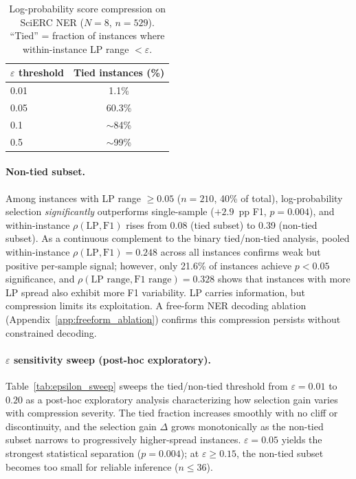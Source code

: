 \begin{table}[t]
\centering
\small
\caption{Log-probability score compression on SciERC NER ($N{=}8$, $n{=}529$). ``Tied'' = fraction of instances where within-instance LP range ${<}\varepsilon$.}
\label{tab:logprob_ties}
\begin{tabular}{lc}
\toprule
$\varepsilon$ threshold & Tied instances (\%) \\
\midrule
0.01 & 1.1\% \\
0.05 & 60.3\% \\
0.1  & ${\sim}$84\% \\
0.5  & ${\sim}$99\% \\
\bottomrule
\end{tabular}
\end{table}

\paragraph{Non-tied subset.}
Among instances with LP range ${\geq}0.05$ ($n{=}210$, 40\% of total), log-probability selection \textit{significantly} outperforms single-sample ($+2.9$~pp F1, $p{=}0.004$), and within-instance $\rho(\text{LP}, \text{F1})$ rises from 0.08 (tied subset) to 0.39 (non-tied subset).
As a continuous complement to the binary tied/non-tied analysis, pooled within-instance $\rho(\text{LP}, \text{F1}){=}0.248$ across all instances confirms weak but positive per-sample signal; however, only 21.6\% of instances achieve $p{<}0.05$ significance, and $\rho(\text{LP range}, \text{F1 range}){=}0.328$ shows that instances with more LP spread also exhibit more F1 variability. LP carries information, but compression limits its exploitation.
A free-form NER decoding ablation (Appendix~\ref{app:freeform_ablation}) confirms this compression persists without constrained decoding.

\paragraph{$\varepsilon$ sensitivity sweep (post-hoc exploratory).}
Table~\ref{tab:epsilon_sweep} sweeps the tied/non-tied threshold from $\varepsilon{=}0.01$ to $0.20$ as a post-hoc exploratory analysis characterizing how selection gain varies with compression severity.
The tied fraction increases smoothly with no cliff or discontinuity, and the selection gain $\Delta$ grows monotonically as the non-tied subset narrows to progressively higher-spread instances.
$\varepsilon{=}0.05$ yields the strongest statistical separation ($p{=}0.004$); at $\varepsilon{\geq}0.15$, the non-tied subset becomes too small for reliable inference ($n{\leq}36$).

